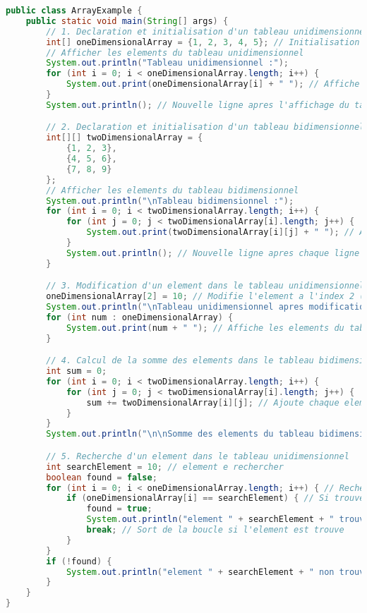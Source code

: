 \documentclass{article}
\begin{document}
\begin{lstlisting}[language=Java]
public class ArrayExample {
    public static void main(String[] args) {
        // 1. Declaration et initialisation d'un tableau unidimensionnel
        int[] oneDimensionalArray = {1, 2, 3, 4, 5}; // Initialisation correcte
        // Afficher les elements du tableau unidimensionnel
        System.out.println("Tableau unidimensionnel :");
        for (int i = 0; i < oneDimensionalArray.length; i++) {
            System.out.print(oneDimensionalArray[i] + " "); // Affiche chaque element
        }
        System.out.println(); // Nouvelle ligne apres l'affichage du tableau

        // 2. Declaration et initialisation d'un tableau bidimensionnel (matrice)
        int[][] twoDimensionalArray = {
            {1, 2, 3},
            {4, 5, 6},
            {7, 8, 9}
        };
        // Afficher les elements du tableau bidimensionnel
        System.out.println("\nTableau bidimensionnel :");
        for (int i = 0; i < twoDimensionalArray.length; i++) {
            for (int j = 0; j < twoDimensionalArray[i].length; j++) {
                System.out.print(twoDimensionalArray[i][j] + " "); // Affiche chaque element
            }
            System.out.println(); // Nouvelle ligne apres chaque ligne de la matrice
        }

        // 3. Modification d'un element dans le tableau unidimensionnel
        oneDimensionalArray[2] = 10; // Modifie l'element a l'index 2 (le troisieme element)
        System.out.println("\nTableau unidimensionnel apres modification :");
        for (int num : oneDimensionalArray) {
            System.out.print(num + " "); // Affiche les elements du tableau modifie
        }

        // 4. Calcul de la somme des elements dans le tableau bidimensionnel
        int sum = 0;
        for (int i = 0; i < twoDimensionalArray.length; i++) {
            for (int j = 0; j < twoDimensionalArray[i].length; j++) {
                sum += twoDimensionalArray[i][j]; // Ajoute chaque element a la somme
            }
        }
        System.out.println("\n\nSomme des elements du tableau bidimensionnel: " + sum);

        // 5. Recherche d'un element dans le tableau unidimensionnel
        int searchElement = 10; // element e rechercher
        boolean found = false;
        for (int i = 0; i < oneDimensionalArray.length; i++) { // Recherche dans le tableau
            if (oneDimensionalArray[i] == searchElement) { // Si trouve
                found = true;
                System.out.println("element " + searchElement + " trouve a l'index " + i);
                break; // Sort de la boucle si l'element est trouve
            }
        }
        if (!found) {
            System.out.println("element " + searchElement + " non trouve dans le tableau.");
        }
    }
}
\end{lstlisting}
\end{document}

